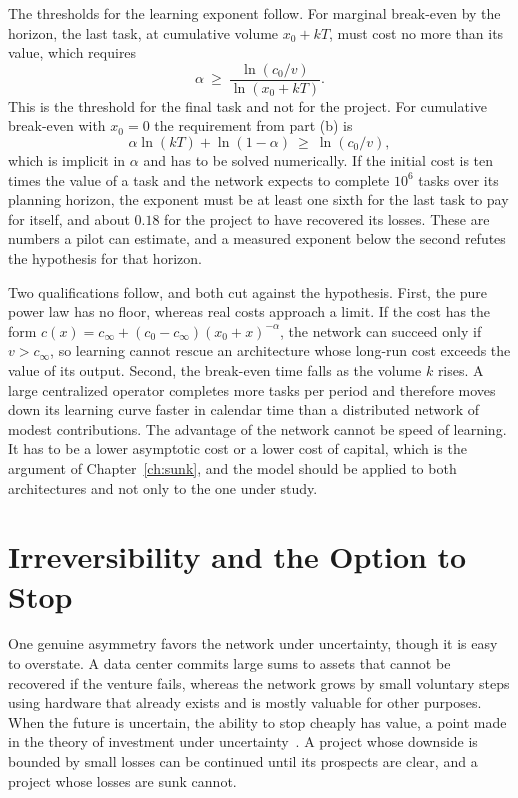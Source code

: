 The thresholds for the learning exponent follow. For marginal break-even by the horizon, the last task, at cumulative volume $x_0+kT$, must cost no more than its value, which requires
\[
\alpha\ \ge\ \frac{\ln(c_0/v)}{\ln(x_0+kT)}.
\]
This is the threshold for the final task and not for the project. For cumulative break-even with $x_0=0$ the requirement from part (b) is
\[
\alpha\ln(kT)+\ln(1-\alpha)\ \ge\ \ln(c_0/v),
\]
which is implicit in $\alpha$ and has to be solved numerically. If the initial cost is ten times the value of a task and the network expects to complete $10^{6}$ tasks over its planning horizon, the exponent must be at least one sixth for the last task to pay for itself, and about $0.18$ for the project to have recovered its losses. These are numbers a pilot can estimate, and a measured exponent below the second refutes the hypothesis for that horizon.

Two qualifications follow, and both cut against the hypothesis. First, the pure power law has no floor, whereas real costs approach a limit. If the cost has the form $c(x)=c_\infty+(c_0-c_\infty)(x_0+x)^{-\alpha}$, the network can succeed only if $v>c_\infty$, so learning cannot rescue an architecture whose long-run cost exceeds the value of its output. Second, the break-even time falls as the volume $k$ rises. A large centralized operator completes more tasks per period and therefore moves down its learning curve faster in calendar time than a distributed network of modest contributions. The advantage of the network cannot be speed of learning. It has to be a lower asymptotic cost or a lower cost of capital, which is the argument of Chapter~\ref{ch:sunk}, and the model should be applied to both architectures and not only to the one under study.

\section{Irreversibility and the Option to Stop}

One genuine asymmetry favors the network under uncertainty, though it is easy to overstate. A data center commits large sums to assets that cannot be recovered if the venture fails, whereas the network grows by small voluntary steps using hardware that already exists and is mostly valuable for other purposes. When the future is uncertain, the ability to stop cheaply has value, a point made in the theory of investment under uncertainty~\cite{dixit1994}. A project whose downside is bounded by small losses can be continued until its prospects are clear, and a project whose losses are sunk cannot.

